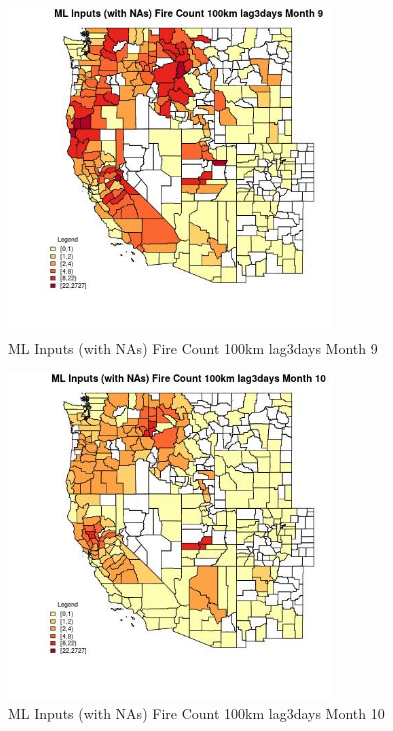 \begin{figure} 
\centering  
\includegraphics[width=0.77\textwidth]{Code_Outputs/Report_ML_input_PM25_Step4_part_f_de_duplicated_aveswNAs_CountyFire_Count_100km_lag3daysmedianMonth9.jpg} 
\caption{\label{fig:Report_ML_input_PM25_Step4_part_f_de_duplicated_aveswNAsCountyFire_Count_100km_lag3daysmedianMonth9}ML Inputs (with NAs) Fire Count 100km lag3days Month 9} 
\end{figure} 
 

\begin{figure} 
\centering  
\includegraphics[width=0.77\textwidth]{Code_Outputs/Report_ML_input_PM25_Step4_part_f_de_duplicated_aveswNAs_CountyFire_Count_100km_lag3daysmedianMonth10.jpg} 
\caption{\label{fig:Report_ML_input_PM25_Step4_part_f_de_duplicated_aveswNAsCountyFire_Count_100km_lag3daysmedianMonth10}ML Inputs (with NAs) Fire Count 100km lag3days Month 10} 
\end{figure} 
 

